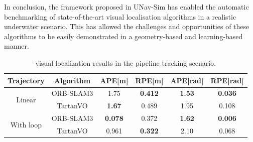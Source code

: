 In conclusion, the framework proposed in UNav-Sim has enabled the automatic benchmarking of state-of-the-art visual localisation algorithms in a realistic underwater scenario. This has allowed the challenges and opportunities of these algorithms to be easily demonstrated in a geometry-based and learning-based manner.

\begin{table}[ht!]
\centering
\scriptsize
\caption{visual localization results in the pipeline tracking scenario.}
\label{table:comparisonSLAM}
\begin{tabular}{cc c c c c  }
\toprule

Trajectory                   & Algorithm  & APE[m]         & RPE[m]         & APE[rad]       & RPE[rad] \\
\midrule
\multirow{2}{*}[0em]{Linear} & ORB-SLAM3  & 1.75          & \textbf{0.412} & \textbf{1.53} & \textbf{0.036} \\
                             & TartanVO   & \textbf{1.67} & 0.489          & 1.95          & 0.108 \\
\midrule
\multirow{2}{*}[0em]{With loop}   & ORB-SLAM3  & \textbf{0.078}          & 0.372 & \textbf{1.62} & \textbf{0.006} \\
                             & TartanVO   & 0.961 & \textbf{0.322}         & 2.10          & 0.068 \\
\bottomrule
\end{tabular}
\end{table}





